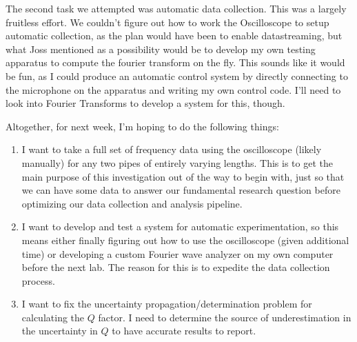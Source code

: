 \documentclass[14pt]{extarticle}
\begin{document}
The second task we attempted was automatic data collection. This was a largely fruitless effort. We couldn't figure out how to work the Oscilloscope to setup automatic collection, as the plan would have been to enable datastreaming, but what Joss mentioned as a possibility would be to develop my own testing apparatus to compute the fourier transform on the fly. This sounds like it would be fun, as I could produce an automatic control system by directly connecting to the microphone on the apparatus and writing my own control code. I'll need to look into Fourier Transforms to develop a system for this, though.

Altogether, for next week, I'm hoping to do the following things:
\begin{enumerate}
\item I want to take a full set of frequency data using the oscilloscope (likely manually) for any two pipes of entirely varying lengths. This is to get the main purpose of this investigation out of the way to begin with, just so that we can have some data to answer our fundamental research question before optimizing our data collection and analysis pipeline.
\item I want to develop and test a system for automatic experimentation, so this means either finally figuring out how to use the oscilloscope (given additional time) or developing a custom Fourier wave analyzer on my own computer before the next lab. The reason for this is to expedite the data collection process.
\item I want to fix the uncertainty propagation/determination problem for calculating the $Q$ factor. I need to determine the source of underestimation in the uncertainty in $Q$ to have accurate results to report.
\end{enumerate}
\end{document}
